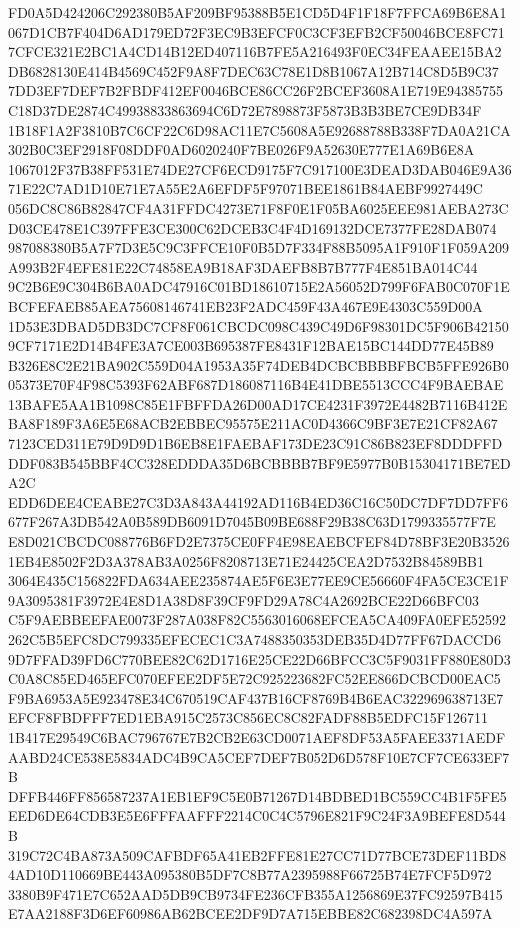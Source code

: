 \documentclass[UTF8,fontset=fandol,zihao=-4,a4paper]{ctexart}
\begin{document}
{{FD0A5D424206C292380B5AF209BF95388B5E1CD5D4F1F18F7FFCA69B6E8A1067D1CB7F404D6AD179ED72F3EC9B3EFCF0C3CF3EFB2CF50046BCE8FC71
7CFCE321E2BC1A4CD14B12ED407116B7FE5A216493F0EC34FEAAEE15BA2DB6828130E414B4569C452F9A8F7DEC63C78E1D8B1067A12B714C8D5B9C37
7DD3EF7DEF7B2FBDF412EF0046BCE86CC26F2BCEF3608A1E719E94385755C18D37DE2874C49938833863694C6D72E7898873F5873B3B3BE7CE9DB34F
1B18F1A2F3810B7C6CF22C6D98AC11E7C5608A5E92688788B338F7DA0A21CA302B0C3EF2918F08DDF0AD6020240F7BE026F9A52630E777E1A69B6E8A
1067012F37B38FF531E74DE27CF6ECD9175F7C917100E3DEAD3DAB046E9A3671E22C7AD1D10E71E7A55E2A6EFDF5F97071BEE1861B84AEBF9927449C
056DC8C86B82847CF4A31FFDC4273E71F8F0E1F05BA6025EEE981AEBA273CD03CE478E1C397FFE3CE300C62DCEB3C4F4D169132DCE7377FE28DAB074
987088380B5A7F7D3E5C9C3FFCE10F0B5D7F334F88B5095A1F910F1F059A209A993B2F4EFE81E22C74858EA9B18AF3DAEFB8B7B777F4E851BA014C44
9C2B6E9C304B6BA0ADC47916C01BD18610715E2A56052D799F6FAB0C070F1EBCFEFAEB85AEA75608146741EB23F2ADC459F43A467E9E4303C559D00A
1D53E3DBAD5DB3DC7CF8F061CBCDC098C439C49D6F98301DC5F906B421509CF7171E2D14B4FE3A7CE003B695387FE8431F12BAE15BC144DD77E45B89
B326E8C2E21BA902C559D04A1953A35F74DEB4DCBCBBBBFBCB5FFE926B005373E70F4F98C5393F62ABF687D186087116B4E41DBE5513CCC4F9BAEBAE
13BAFE5AA1B1098C85E1FBFFDA26D00AD17CE4231F3972E4482B7116B412EBA8F189F3A6E5E68ACB2EBBEC95575E211AC0D4366C9BF3E7E21CF82A67
7123CED311E79D9D9D1B6EB8E1FAEBAF173DE23C91C86B823EF8DDDFFDDDF083B545BBF4CC328EDDDA35D6BCBBBB7BF9E5977B0B15304171BE7EDA2C
EDD6DEE4CEABE27C3D3A843A44192AD116B4ED36C16C50DC7DF7DD7FF6677F267A3DB542A0B589DB6091D7045B09BE688F29B38C63D1799335577F7E
E8D021CBCDC088776B6FD2E7375CE0FF4E98EAEBCFEF84D78BF3E20B35261EB4E8502F2D3A378AB3A0256F8208713E71E24425CEA2D7532B84589BB1
3064E435C156822FDA634AEE235874AE5F6E3E77EE9CE56660F4FA5CE3CE1F9A3095381F3972E4E8D1A38D8F39CF9FD29A78C4A2692BCE22D66BFC03
C5F9AEBBEEFAE0073F287A038F82C5563016068EFCEA5CA409FA0EFE52592262C5B5EFC8DC799335EFECEC1C3A7488350353DEB35D4D77FF67DACCD6
9D7FFAD39FD6C770BEE82C62D1716E25CE22D66BFCC3C5F9031FF880E80D3C0A8C85ED465EFC070EFEE2DF5E72C925223682FC52EE866DCBCD00EAC5
F9BA6953A5E923478E34C670519CAF437B16CF8769B4B6EAC322969638713E7EFCF8FBDFFF7ED1EBA915C2573C856EC8C82FADF88B5EDFC15F126711
1B417E29549C6BAC796767E7B2CB2E63CD0071AEF8DF53A5FAEE3371AEDFAABD24CE538E5834ADC4B9CA5CEF7DEF7B052D6D578F10E7CF7CE633EF7B
DFFB446FF856587237A1EB1EF9C5E0B71267D14BDBED1BC559CC4B1F5FE5EED6DE64CDB3E5E6FFFAAFFF2214C0C4C5796E821F9C24F3A9BEFE8D544B
319C72C4BA873A509CAFBDF65A41EB2FFE81E27CC71D77BCE73DEF11BD84AD10D110669BE443A095380B5DF7C8B77A2395988F66725B74E7FCF5D972
3380B9F471E7C652AAD5DB9CB9734FE236CFB355A1256869E37FC92597B415E7AA2188F3D6EF60986AB62BCEE2DF9D7A715EBBE82C682398DC4A597A
}}
\end{document}
